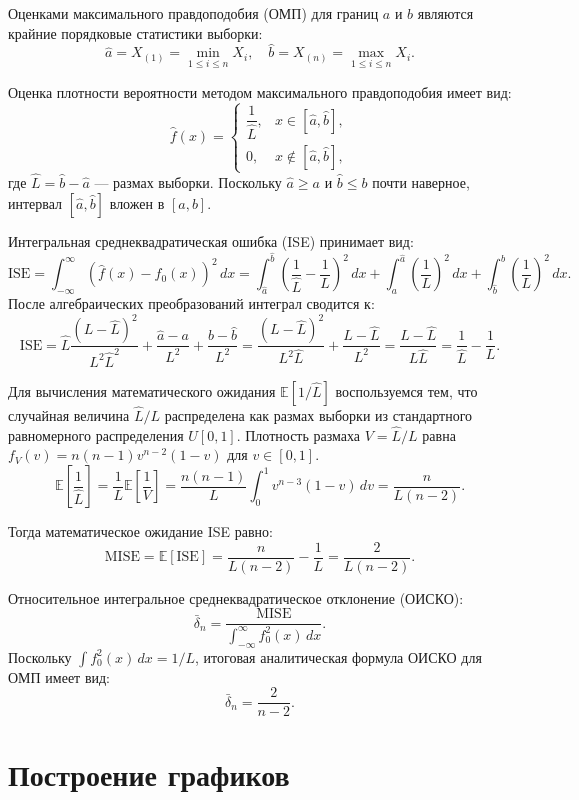 \documentclass[12pt,a4paper]{article}
\begin{document}
Оценками максимального правдоподобия (ОМП) для границ $a$ и $b$ являются крайние порядковые статистики выборки:
\[
\hat{a} = X_{(1)} = \min_{1 \le i \le n} X_i, \quad \hat{b} = X_{(n)} = \max_{1 \le i \le n} X_i.
\]

Оценка плотности вероятности методом максимального правдоподобия имеет вид:
\[
\hat{f}(x) = 
\begin{cases}
\dfrac{1}{\hat{L}}, & x \in [\hat{a}, \hat{b}], \\
0, & x \notin [\hat{a}, \hat{b}],
\end{cases}
\]
где $\hat{L} = \hat{b} - \hat{a}$ — размах выборки. Поскольку $\hat{a} \ge a$ и $\hat{b} \le b$ почти наверное, интервал $[\hat{a}, \hat{b}]$ вложен в $[a, b]$. 

Интегральная среднеквадратическая ошибка (ISE) принимает вид:
\[
\text{ISE} = \int_{-\infty}^{\infty} (\hat{f}(x) - f_0(x))^2 \,dx = \int_{\hat{a}}^{\hat{b}} \left(\frac{1}{\hat{L}} - \frac{1}{L}\right)^2 \,dx + \int_{a}^{\hat{a}} \left(\frac{1}{L}\right)^2 \,dx + \int_{\hat{b}}^{b} \left(\frac{1}{L}\right)^2 \,dx.
\]
После алгебраических преобразований интеграл сводится к:
\[
\text{ISE} = \hat{L} \frac{(L - \hat{L})^2}{L^2 \hat{L}^2} + \frac{\hat{a} - a}{L^2} + \frac{b - \hat{b}}{L^2} = \frac{(L - \hat{L})^2}{L^2 \hat{L}} + \frac{L - \hat{L}}{L^2} = \frac{L - \hat{L}}{L \hat{L}} = \frac{1}{\hat{L}} - \frac{1}{L}.
\]

Для вычисления математического ожидания $\mathbb{E}[1/\hat{L}]$ воспользуемся тем, что случайная величина $\hat{L}/L$ распределена как размах выборки из стандартного равномерного распределения $U[0, 1]$. Плотность размаха $V = \hat{L}/L$ равна $f_V(v) = n(n-1)v^{n-2}(1-v)$ для $v \in [0,1]$.
\[
\mathbb{E}\left[\frac{1}{\hat{L}}\right] = \frac{1}{L} \mathbb{E}\left[\frac{1}{V}\right] = \frac{n(n-1)}{L} \int_0^1 v^{n-3}(1-v) \,dv = \frac{n}{L(n-2)}.
\]

Тогда математическое ожидание ISE равно:
\[
\text{MISE} = \mathbb{E}[\text{ISE}] = \frac{n}{L(n-2)} - \frac{1}{L} = \frac{2}{L(n-2)}.
\]

Относительное интегральное среднеквадратическое отклонение (ОИСКО):
\[
\bar{\delta}_n = \frac{\text{MISE}}{\int_{-\infty}^{\infty} f_0^2(x)\,dx}.
\]
Поскольку $\int f_0^2(x)\,dx = 1/L$, итоговая аналитическая формула ОИСКО для ОМП имеет вид:
\[
\bar{\delta}_n = \frac{2}{n - 2}.
\]

\section*{Построение графиков}
\end{document}
